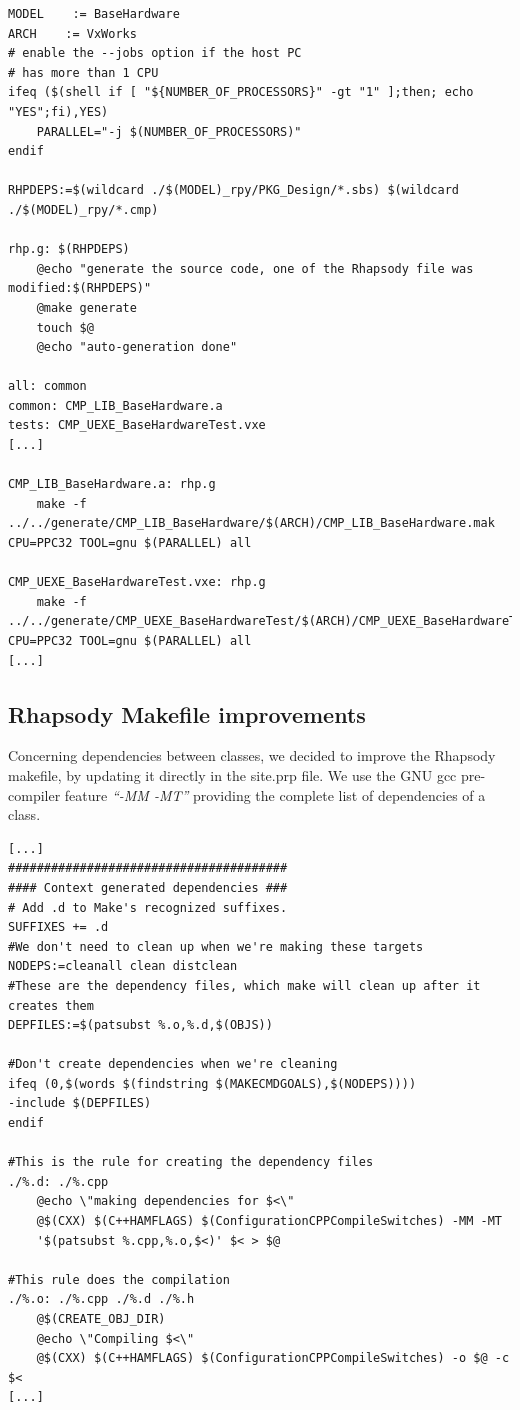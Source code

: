 \documentclass[dvips]{imsart}
\begin{document}
\label{parallelCompil}
\begin{lstlisting}
MODEL    := BaseHardware
ARCH    := VxWorks
# enable the --jobs option if the host PC
# has more than 1 CPU
ifeq ($(shell if [ "${NUMBER_OF_PROCESSORS}" -gt "1" ];then; echo "YES";fi),YES)
    PARALLEL="-j $(NUMBER_OF_PROCESSORS)"
endif

RHPDEPS:=$(wildcard ./$(MODEL)_rpy/PKG_Design/*.sbs) $(wildcard
./$(MODEL)_rpy/*.cmp)

rhp.g: $(RHPDEPS)
    @echo "generate the source code, one of the Rhapsody file was modified:$(RHPDEPS)"
    @make generate
    touch $@
    @echo "auto-generation done"

all: common
common: CMP_LIB_BaseHardware.a
tests: CMP_UEXE_BaseHardwareTest.vxe
[...]

CMP_LIB_BaseHardware.a: rhp.g
    make -f ../../generate/CMP_LIB_BaseHardware/$(ARCH)/CMP_LIB_BaseHardware.mak CPU=PPC32 TOOL=gnu $(PARALLEL) all

CMP_UEXE_BaseHardwareTest.vxe: rhp.g
   	make -f ../../generate/CMP_UEXE_BaseHardwareTest/$(ARCH)/CMP_UEXE_BaseHardwareTest.mak CPU=PPC32 TOOL=gnu $(PARALLEL) all
[...]
\end{lstlisting}

\subsection{Rhapsody Makefile improvements}
Concerning dependencies between classes, we decided to improve the Rhapsody
makefile, by updating it directly in the site.prp file.
We use the GNU gcc \cite{GNUgcc-08} pre-compiler feature \emph{``-MM -MT''}
providing the complete list of dependencies of a class.

\lstset{frame=shadowbox, numbers=left, breaklines=true,
caption=snippet of site.prp: ``Property MakeFileContent MultiLine''
replacing:\$OMContextMacros}
\begin{lstlisting}
[...]
#######################################
#### Context generated dependencies ###
# Add .d to Make's recognized suffixes.
SUFFIXES += .d
#We don't need to clean up when we're making these targets
NODEPS:=cleanall clean distclean
#These are the dependency files, which make will clean up after it creates them
DEPFILES:=$(patsubst %.o,%.d,$(OBJS))

#Don't create dependencies when we're cleaning
ifeq (0,$(words $(findstring $(MAKECMDGOALS),$(NODEPS))))
-include $(DEPFILES)
endif

#This is the rule for creating the dependency files
./%.d: ./%.cpp
    @echo \"making dependencies for $<\"
    @$(CXX) $(C++HAMFLAGS) $(ConfigurationCPPCompileSwitches) -MM -MT
    '$(patsubst %.cpp,%.o,$<)' $< > $@

#This rule does the compilation
./%.o: ./%.cpp ./%.d ./%.h
    @$(CREATE_OBJ_DIR)
    @echo \"Compiling $<\"
	@$(CXX) $(C++HAMFLAGS) $(ConfigurationCPPCompileSwitches) -o $@ -c $<
[...]
\end{lstlisting}
\end{document}
